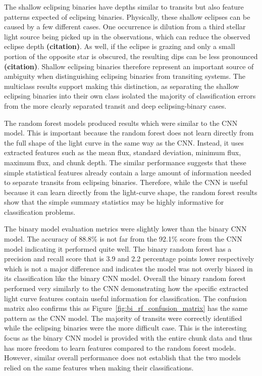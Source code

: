 The shallow eclipsing binaries have depths similar to transits but also feature patterns expected of eclipsing binaries. Physically, these shallow eclipses can be caused by a few different cases. One occurrence is dilution from a third stellar light source being picked up in the observations, which can reduce the observed eclipse depth \textbf{(citation)}. As well, if the eclipse is grazing and only a small portion of the opposite star is obscured, the resulting dips can be less pronounced \textbf{(citation)}. Shallow eclipsing binaries therefore represent an important source of ambiguity when distinguishing eclipsing binaries from transiting systems. The multiclass results support making this distinction, as separating the shallow eclipsing binaries into their own class isolated the majority of classification errors from the more clearly separated transit and deep eclipsing-binary cases.

The random forest models produced results which were similar to the CNN model. This is important because the random forest does not learn directly from the full shape of the light curve in the same way as the CNN. Instead, it uses extracted features such as the mean flux, standard deviation, minimum flux, maximum flux, and chunk depth. The similar performance suggests that these simple statistical features already contain a large amount of information needed to separate transits from eclipsing binaries. Therefore, while the CNN is useful because it can learn directly from the light-curve shape, the random forest results show that the simple summary statistics may be highly informative for classification problems. 

The binary model evaluation metrics were slightly lower than the binary CNN model. The accuracy of 88.8\% is not far from the 92.1\% score from the CNN model indicating it performed quite well. The binary random forest has a precision and recall score that is 3.9 and 2.2 percentage points lower respectively which is not a major difference and indicates the model was not overly biased in its classification like the binary CNN model. Overall the binary random forest performed very similarly to the CNN demonstrating how the specific extracted light curve features contain useful information for classification. The confusion matrix also confirms this as Figure~\ref{fig:bi_rf_confusion_matrix} has the same pattern as the CNN model. The majority of transits were correctly identified while the eclipsing binaries were the more difficult case. This is the interesting focus as the binary CNN model is provided with the entire chunk data and thus has more freedom to learn features compared to the random forest models. However, similar overall performance does not establish that the two models relied on the same features when making their classifications.

